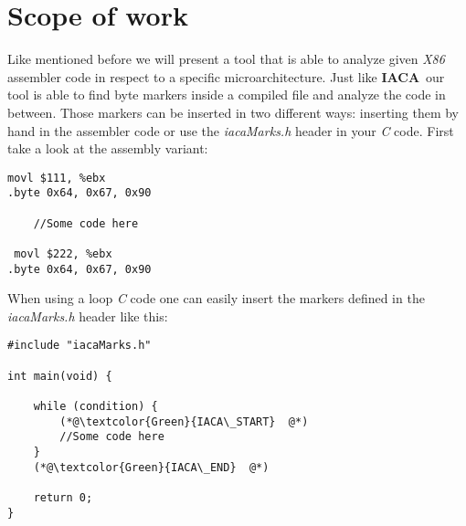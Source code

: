 \documentclass[a4paper,12pt,titlepage, twoside]{report}
\newcommand{\iaca}{\textbf{IACA}}
\begin{document}
\newpage
\section{Scope of work}

Like mentioned before we will present a tool that is able to analyze given \emph{X86} assembler code in respect to a specific microarchitecture. Just like \iaca\ our tool is able to find byte markers inside a compiled file and analyze the code in between. Those markers can be inserted in two different ways: inserting them by hand in the assembler code or use the \emph{iacaMarks.h} header in your \emph{C} code. First take a look at the assembly variant:

\begin{mdframed}[backgroundcolor=light-gray, roundcorner=10pt,leftmargin=1, rightmargin=1, innerleftmargin=15, innertopmargin=1,innerbottommargin=1, outerlinewidth=1, linecolor=light-gray]
\begin{lstlisting}[language={myLang}]
 movl $111, %ebx
.byte 0x64, 0x67, 0x90

    //Some code here
    
 movl $222, %ebx
.byte 0x64, 0x67, 0x90
\end{lstlisting}
\end{mdframed}

When using a loop \emph{C} code one can easily insert the markers defined in the \emph{iacaMarks.h} header like this:

\begin{mdframed}[backgroundcolor=light-gray, roundcorner=10pt,leftmargin=1, rightmargin=1, innerleftmargin=15, innertopmargin=1,innerbottommargin=1, outerlinewidth=1, linecolor=light-gray]
\begin{lstlisting}
#include "iacaMarks.h"

int main(void) {

    while (condition) {
        (*@\textcolor{Green}{IACA\_START}  @*)
        //Some code here
    }
    (*@\textcolor{Green}{IACA\_END}  @*)

    return 0;
}
\end{lstlisting}
\end{mdframed}
\end{document}
